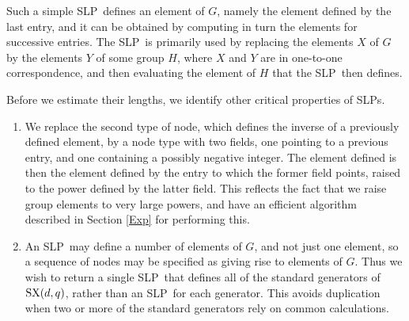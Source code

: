 \documentclass[12pt]{article}
\def\SX{{\rm SX}}
\def\SLP{{\rm SLP}}
\def\SLPs{{\rm SLPs}}
\begin{document}
Such a simple \SLP\ defines an element 
of $G$, namely the element defined by the last entry, and it 
can be obtained by computing in turn
the elements for successive entries.
The \SLP\ is primarily used by replacing the elements 
$X$ of $G$ by the elements $Y$ of some group
$H$, where $X$ and $Y$ are in one-to-one correspondence, and then evaluating 
the element of $H$ that the \SLP\ then defines.

Before we estimate their lengths, we 
identify other critical properties of \SLPs. 
\begin{enumerate}
\item 
We replace the second type of node, which defines the 
inverse of a previously defined element, by a node type with two fields, 
one pointing to a previous entry, and one containing 
a possibly negative integer.  The element defined is then the 
element defined by the entry to which
the former field points, raised to the power defined by 
the latter field.  This reflects the fact that we
raise group elements to very large powers, and have 
an efficient algorithm described in Section \ref{Exp} for performing this.

\item 
An \SLP\ may define a number of elements of $G$,
and not just one element, so a sequence of nodes may be specified as 
giving rise to elements
of $G$.  Thus we wish to return a single \SLP\ that defines 
all of the standard generators of $\SX(d,q)$, rather than an \SLP\ 
for each generator.
This avoids duplication when two or more of the standard generators 
rely on common calculations.


\end{enumerate}
\end{document}
